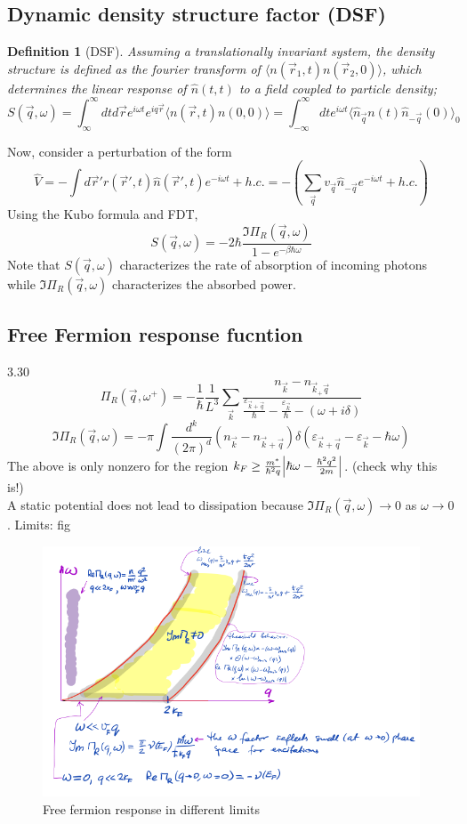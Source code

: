 \documentclass[10pt]{article}
\newtheorem*{defn}{Definition}
\begin{document}
\subsection{Dynamic density structure factor (DSF)}
\begin{defn}[DSF]
Assuming a translationally invariant system, the density structure is defined as the fourier transform of $\langle n(\vec r_1, t) n(\vec r_2, 0) \rangle$, which determines the linear response of $\hat n(t, t)$ to a field coupled to particle density;
$$
S(\vec q, \omega) = \int_{\infty}^\infty dt d\vec r e^{i\omega t}e^{iq\vec r} \langle n(\vec r, t)n(0, 0)\rangle = \int_{-\infty}^\infty dt e^{i\omega t}\langle \hat n_{\vec q}n(t)\hat n_{-\vec q}(0)\rangle_0
$$
\end{defn}
Now, consider a perturbation of the form
$$
\hat V = -\int d\vec r' r(\vec r', t) \hat n(\vec r', t) e^{-i\omega t} + h.c. = -(\sum_{\vec q}v_{\vec q}\hat n_{-\vec q}e^{-i\omega t} + h.c.)
$$
Using the Kubo formula and FDT,
$$
S(\vec q, \omega) = -2\hbar \frac{\Im \Pi_R(\vec q, \omega)}{1-e^{-\beta \hbar \omega}}
$$
Note that $S(\vec q, \omega)$ characterizes the rate of absorption of incoming photons while $\Im \Pi_R(\vec q, \omega)$ characterizes the absorbed power.

\subsection{Free Fermion response fucntion}
3.30
$$
\Pi_R(\vec q, \omega^+) = -\frac{1}{\hbar}\frac{1}{L^3}\sum_{\vec k}\frac{n_{\vec k}-n_{\vec k _+ \vec q}}{\frac{\varepsilon_{\vec k + \vec q}}{\hbar}-\frac{\varepsilon_{\vec k}}{\hbar}-(\omega + i\delta)}
$$
$$
\Im \Pi_R(\vec q, \omega) = -\pi \int \frac{d^k}{(2\pi)^d}(n_{\vec k}-n_{\vec k + \vec q})\delta(\varepsilon_{\vec k + \vec q} - \varepsilon_{\vec k}-\hbar \omega)
$$
The above is only nonzero for the region $k_F \geq \frac{m^\ast}{\hbar^2q}\qty|\hbar \omega - \frac{\hbar^2q^2}{2m}|$. (check why this is!)\\
A static potential does not lead to dissipation because $\Im \Pi_R(\vec q, \omega) \to 0$ as $\omega \to 0$.
Limits:
fig
\begin{figure}[ht]
    \centering
    \includegraphics[scale=.4]{./figures/fig.png}
    \caption{Free fermion response in different limits}
    \label{fig:fig}
\end{figure}
\end{document}
